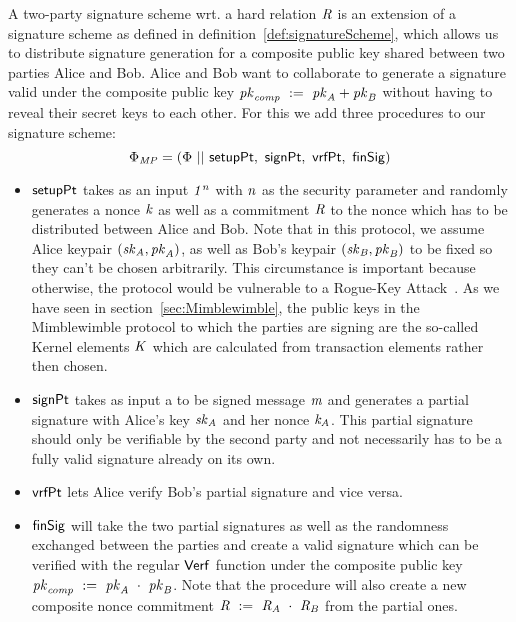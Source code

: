 \begin{definition}
    \label{def:twoPartySig}
    A two-party signature scheme wrt. a hard relation $\mathit{R}$ is an extension of a signature scheme as defined in definition~\ref{def:signatureScheme}, which allows us to distribute signature generation for a composite public key shared between two parties Alice and Bob.
    Alice and Bob want to collaborate to generate a signature valid under the composite public key $\mathit{pk}_{\mathit{comp}} ~:=~ \mathit{pk}_{\mathit{A}} + \mathit{pk}_{\mathit{B}}$ without having to reveal their secret keys to each other. For this we add three procedures to our signature scheme:
    \[ \Phi_{\mathit{MP}} = (\Phi ~||~ \mathsf{setupPt} ,~ \mathsf{signPt} ,~ \mathsf{vrfPt} ,~ \mathsf{finSig}) \]
    \begin{itemize}
        \item $\mathsf{setupPt}$ takes as an input $\mathit{1^n}$ with $\mathit{n}$ as the security parameter and randomly generates a nonce $\mathit{k}$ as well as a commitment $\mathit{R}$ to the nonce which has to be distributed between Alice and Bob.
               Note that in this protocol, we assume Alice keypair $(\mathit{sk}_{\mathit{A}}, \mathit{pk}_{\mathit{A}})$, as well as Bob's keypair $(\mathit{sk}_{\mathit{B}}, \mathit{pk}_{\mathit{B}})$ to be fixed so they can't be chosen arbitrarily. This circumstance is important because otherwise, the protocol would be vulnerable to a
               Rogue-Key Attack~\cite{horster1995meta}. As we have seen in section~\ref{sec:Mimblewimble}, the public keys in the Mimblewimble protocol to which the parties are signing are the so-called Kernel elements $\mathit{K}$ which are calculated from transaction elements
               rather then chosen.
        \item $\mathsf{signPt}$ takes as input a to be signed message $\mathit{m}$ and generates a partial signature with Alice's key $\mathit{sk}_{\mathit{A}}$ and her nonce $\mathit{\mathit{k}_{\mathit{A}}}$. This partial signature should only be verifiable by the second party and not necessarily
               has to be a fully valid signature already on its own.
        \item $\mathsf{vrfPt}$ lets Alice verify Bob's partial signature and vice versa.
        \item $\mathsf{finSig}$ will take the two partial signatures as well as the randomness exchanged between the parties and create a valid signature which can be verified with the regular $\mathsf{Verf}$ function under the composite public key
        $\mathit{pk}_{\mathit{comp}} ~:=~ \mathit{pk}_{\mathit{A}} ~\cdot~ \mathit{pk}_{\mathit{B}}$. Note that the procedure will also create a new composite nonce commitment $\mathit{R} ~:=~ \mathit{R}_{\mathit{A}} ~\cdot~ \mathit{R}_{\mathit{B}}$ from the partial ones.
    \end{itemize}
\end{definition}

